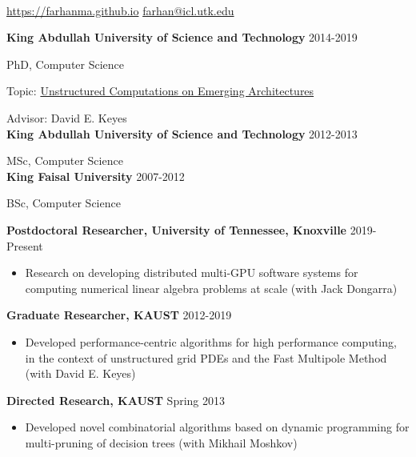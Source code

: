 \documentclass[9pt,a4paper]{extarticle}
\makeatletter
\newcommand{\NAME}{Mohammed Al Farhan}
\newcommand{\SITE}{https://farhanma.github.io}
\newcommand{\EMAIL}{farhan@icl.utk.edu}
\makeatother
\begin{document}
{{\Huge \contour{black}{\textbf{\NAME}}}}\\

\href{\SITE}{\SITE} \hfill
\href{mailto:\EMAIL}{\EMAIL}
\reversemarginpar

\bigskip

{
\textbf{King Abdullah University of Science and Technology} \hfill 2014-2019

PhD, Computer Science

Topic: \href{https://repository.kaust.edu.sa/handle/10754/644902}
{Unstructured Computations on Emerging Architectures}

Advisor: David E. Keyes\\

\textbf{King Abdullah University of Science and Technology} \hfill 2012-2013

MSc, Computer Science\\

\textbf{King Faisal University} \hfill 2007-2012

BSc, Computer Science
}
\bigskip

{
\textbf{Postdoctoral Researcher, University of Tennessee, Knoxville} \hfill 2019-Present
\begin{itemize}
  \item Research on developing distributed multi-GPU software systems for
  computing numerical linear algebra problems at scale (with Jack Dongarra)\\
\end{itemize}

\textbf{Graduate Researcher, KAUST} \hfill 2012-2019
\begin{itemize}
  \item Developed performance-centric algorithms for high performance computing,
  in the context of unstructured grid PDEs and the Fast Multipole Method
  (with David E. Keyes)\\
\end{itemize}

\textbf{Directed Research, KAUST} \hfill Spring 2013
\begin{itemize}
  \item Developed novel combinatorial algorithms based on dynamic programming
  for multi-pruning of decision trees (with Mikhail Moshkov)
\end{itemize}
}
\bigskip
\end{document}
